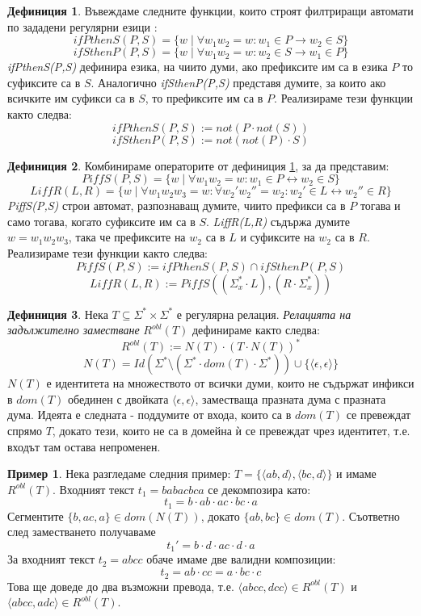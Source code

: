\documentclass[12pt, oneside]{article}
\theoremstyle{definition}
\newtheorem{definition}{Дефиниция}[section]
\newtheorem{example}{Пример}[section]
\begin{document}
\begin{definition}\label{def:defIfPThenS}
	Въвеждаме следните функции, които строят филтриращи автомати по зададени регулярни езици \cite{Kaplan&Kay:94}:
	\[ ifPthenS(P,S) = \{ w \mid \forall w_1w_2 = w: w_1 \in P \to w_2 \in S \} \]
	\[ ifSthenP(P,S) = \{ w \mid \forall w_1w_2 = w: w_2 \in S \to w_1 \in P \} \]
	\emph{ifPthenS(P,S)} дефинира езика, на чиито думи, ако префиксите им са в езика \(P\) то суфиксите са в \(S\). Аналогично \emph{ifSthenP(P,S)} представя думите, за които ако всичките им суфикси са в \(S\), то префиксите им са в \(P\). Реализираме тези функции както следва:
	\[ ifPthenS(P,S) := not(P \cdot not(S)) \]
	\[ ifSthenP(P,S) := not(not(P) \cdot S) \]	
\end{definition}

\begin{definition}
	Комбинираме операторите от дефиниция \ref{def:defIfPThenS}, за да представим:
	\[ PiffS(P,S) = \{ w \mid \forall w_1w_2 = w: w_1 \in P \leftrightarrow w_2 \in S \} \]
	\[ LiffR(L,R) = \{ w \mid \forall w_1w_2w_3 = w: \forall w_2'w_2'' = w_2: w_2' \in L \leftrightarrow w_2'' \in R \} \]
	\emph{PiffS(P,S)} строи автомат, разпознаващ думите, чиито префикси са в \(P\) тогава и само тогава, когато суфиксите им са в \(S\). \emph{LiffR(L,R)} съдържа думите \( w = w_1w_2w_3 \), така че префиксите на \(w_2\) са в \(L\) и суфиксите на \(w_2\) са в \(R\). Реализираме тези функции както следва:
	\[ PiffS(P,S) := ifPthenS(P,S) \cap ifSthenP(P,S) \]
	\[ LiffR(L,R) := PiffS((\Sigma_x^* \cdot L), (R \cdot \Sigma_x^*)) \]	
\end{definition}

\begin{definition}\label{def:Robl}
	Нека \(T \subseteq \Sigma^* \times \Sigma^* \) е регулярна релация. \emph{Релацията на задължително заместване} \(R^{obl}(T)\) дефинираме както следва:
	\[ R^{obl}(T) := N(T) \cdot (T \cdot N(T))^* \]
	\[ N(T) = Id(\Sigma^* \setminus (\Sigma^* \cdot dom(T) \cdot \Sigma^*)) \cup \{ \langle \epsilon, \epsilon \rangle \} \]
	\(N(T)\) е идентитета на множеството от всички думи, които не съдържат инфикси в \(dom(T)\) обединен с двойката \(\langle \epsilon, \epsilon \rangle\), заместваща празната дума с празната дума.
	Идеята е следната - поддумите от входа, които са в \(dom(T)\) се превеждат спрямо \(T\), докато тези, които не са в домейна ѝ се превеждат чрез идентитет, т.е. входът там остава непроменен.
\end{definition}

\begin{example}
	Нека разгледаме следния пример: \(T = \{ \langle ab, d \rangle, \langle bc, d \rangle \} \) и имаме \(R^{obl}(T) \). Входният текст \( t_1 = babacbca \) се декомпозира като:
	\[ t_1 = b \cdot ab \cdot ac \cdot bc \cdot a \]
	Сегментите \(\{b, ac, a\} \in dom(N(T))\), докато \(\{ab, bc\} \in dom(T)\). Съответно след заместването получаваме
	\[ t_1' = b \cdot d \cdot ac \cdot d \cdot a \]
	За входният текст \( t_2 = abcc \) обаче имаме две валидни композиции:
	\[ t_2 = ab \cdot cc = a \cdot bc \cdot c \]
	Това ще доведе до два възможни превода, т.е. \( \langle abcc, dcc \rangle \in R^{obl}(T) \) и \( \langle abcc, adc \rangle \in R^{obl}(T) \).
\end{example}
\end{document}
